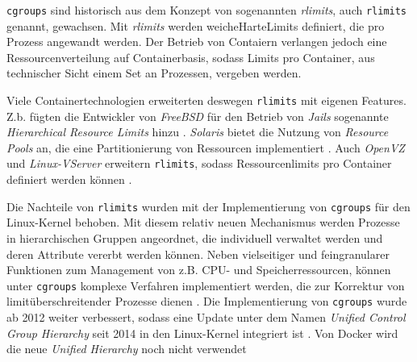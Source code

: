 \documentclass[../main.tex]{subfiles}
\begin{document}

		\texttt{\acrshort{cgroups}} sind historisch aus dem Konzept von sogenannten \emph{\acrlong{rlimits}}, auch \texttt{\acrshort{rlimits}} genannt, gewachsen. Mit \emph{rlimits} werden \gls{weicheHarteLimits} definiert, die pro Prozess angewandt werden. Der Betrieb von Contaiern verlangen jedoch eine Ressourcenverteilung auf Containerbasis, sodass Limits pro Container, aus technischer Sicht einem Set an Prozessen, vergeben werden.


		Viele Containertechnologien erweiterten deswegen \texttt{\acrshort{rlimits}} mit eigenen Features. Z.b. fügten die Entwickler von \emph{FreeBSD} für den Betrieb von \emph{Jails} sogenannte \emph{Hierarchical Resource Limits} hinzu \cite{freeBsdRCTL}. \emph{Solaris} bietet die Nutzung von \emph{Resource Pools} an, die eine Partitionierung von Ressourcen implementiert \cite{cgroupsUniHierarchyDoc}. Auch \emph{OpenVZ} und \emph{Linux-VServer} erweitern \texttt{\acrshort{rlimits}}, sodass Ressourcenlimits pro Container definiert werden können \cite[S.15+16]{dockerSec2}.

		Die Nachteile von \texttt{\acrshort{rlimits}} wurden mit der Implementierung von \texttt{\acrshort{cgroups}} für den Linux-Kernel behoben. Mit diesem relativ neuen Mechanismus werden Prozesse in hierarchischen Gruppen angeordnet, die individuell verwaltet werden und deren Attribute vererbt werden können. Neben vielseitiger und feingranularer Funktionen zum Management von z.B. \acrshort{CPU}- und Speicherressourcen, können unter \texttt{\acrshort{cgroups}} komplexe Verfahren implementiert werden, die zur Korrektur von limitüberschreitender Prozesse dienen \cite{cgroupsRedhat}. Die Implementierung von \texttt{\acrshort{cgroups}} wurde ab 2012 weiter verbessert, sodass eine Update unter dem Namen \emph{Unified Control Group Hierarchy} seit 2014 in den Linux-Kernel integriert ist \cite{cgroupsFixing}\cite{cgroupsUniHierarchy}. Von Docker wird die neue \emph{Unified Hierarchy} noch nicht verwendet \cite{ https://github.com/docker/docker/issues/16238 }
\end{document}
